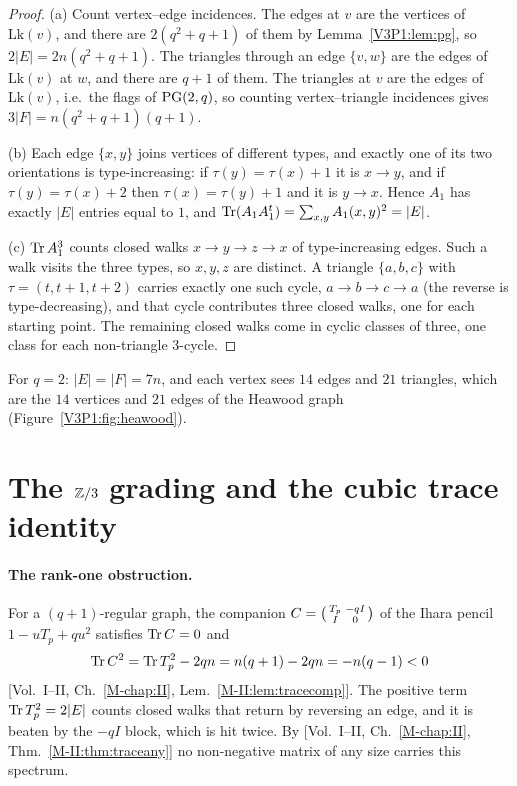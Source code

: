 \begin{proof}
(a) Count vertex--edge incidences. The edges at $v$ are the vertices of $\mathrm{Lk}(v)$, and
there are $2(q^{2}+q+1)$ of them by Lemma~\ref{V3P1:lem:pg}, so $2|E|=2n(q^{2}+q+1)$. The
triangles through an edge $\{v,w\}$ are the edges of $\mathrm{Lk}(v)$ at $w$, and there are
$q+1$ of them. The triangles at $v$ are the edges of $\mathrm{Lk}(v)$, i.e.\ the flags of
$\mathrm{PG}(2,q)$, so counting vertex--triangle incidences gives
$3|F|=n(q^{2}+q+1)(q+1)$.

(b) Each edge $\{x,y\}$ joins vertices of different types, and exactly one of its two
orientations is type-increasing: if $\tau(y)=\tau(x)+1$ it is $x\to y$, and if
$\tau(y)=\tau(x)+2$ then $\tau(x)=\tau(y)+1$ and it is $y\to x$. Hence $A_1$ has exactly
$|E|$ entries equal to $1$, and $\operatorname{Tr}(A_1A_1^{t})=\sum_{x,y}A_1(x,y)^{2}=|E|$.

(c) $\operatorname{Tr} A_1^{3}$ counts closed walks $x\to y\to z\to x$ of type-increasing edges. Such a walk
visits the three types, so $x,y,z$ are distinct. A triangle $\{a,b,c\}$ with
$\tau=(t,t+1,t+2)$ carries exactly one such cycle, $a\to b\to c\to a$ (the reverse is
type-decreasing), and that cycle contributes three closed walks, one for each starting
point. The remaining closed walks come in cyclic classes of three, one class for each
non-triangle $3$-cycle.
\end{proof}

For $q=2$: $|E|=|F|=7n$, and each vertex sees $14$ edges and $21$ triangles, which are the
$14$ vertices and $21$ edges of the Heawood graph (Figure~\ref{V3P1:fig:heawood}).

\section{The \texorpdfstring{$\mathbb{Z}/3$}{Z/3} grading and the cubic trace identity}\label{V3P1:sec:trace}

\paragraph{The rank-one obstruction.} For a $(q+1)$-regular graph, the companion
$C=\begin{psmallmatrix}T_p&-qI\\ I&0\end{psmallmatrix}$ of the Ihara pencil $1-uT_p+qu^{2}$
satisfies $\operatorname{Tr} C=0$ and
\[
\operatorname{Tr} C^{2}=\operatorname{Tr} T_p^{2}-2qn=n(q+1)-2qn=-n(q-1)<0
\]
[Vol.~I--II, Ch.~\ref{M-chap:II}, Lem.~\ref{M-II:lem:tracecomp}]. The positive term $\operatorname{Tr} T_p^{2}=2|E|$
counts closed walks that return by reversing an edge, and it is beaten by the $-qI$ block,
which is hit twice. By [Vol.~I--II, Ch.~\ref{M-chap:II}, Thm.~\ref{M-II:thm:traceany}] no non-negative
matrix of any size carries this spectrum.

